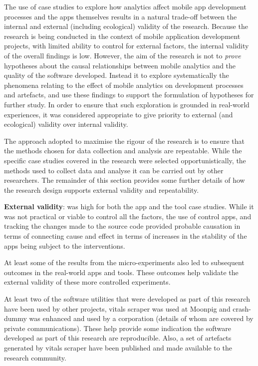 The use of case studies to explore how analytics affect mobile app development processes and the apps themselves results in a natural trade-off between the internal and external (including ecological) validity of the research. Because the research is being conducted in the context of mobile application development projects, with limited ability to control for external factors, the internal validity of the overall findings is low. However, the aim of the research is not to \textit{prove} hypotheses about the causal  relationships between mobile analytics and the quality of the software developed.  Instead it to  explore systematically the phenomena relating to the effect of mobile analytics on development processes and artefacts, and use these findings to support the formulation of hypotheses for further study. In order to ensure that such exploration is grounded in real-world experiences, it was considered appropriate to give priority to  external (and ecological) validity over internal validity.

The approach adopted to maximise the rigour of the research is to ensure that the methods chosen for data collection and analysis are repeatable. While the specific case studies covered in the research were selected opportunistically, the methods used to collect data and analyse it can be carried out by other researchers. The remainder of this section provides some further details of how the research design supports external validity and repeatability.

\textbf{External validity}: was high for both the app and the tool case studies. While it was not practical or viable to control all the factors, the use of control apps, and tracking the changes made to the source code provided probable causation in terms of connecting cause and effect in terms of increases in the stability of the apps being subject to the interventions.

At least some of the results from the micro-experiments also led to subsequent outcomes in the real-world apps and tools. These outcomes help validate the external validity of these more controlled experiments. 

At least two of the software utilities that were developed as part of this research have been used by other projects, vitals scraper was used at Moonpig and crash-dummy was enhanced and used by a corporation (details of whom are covered by private communications). These help provide some indication the software developed as part of this research are reproducible. Also, a set of artefacts generated by vitals scraper have been published and made available to the research community. 

